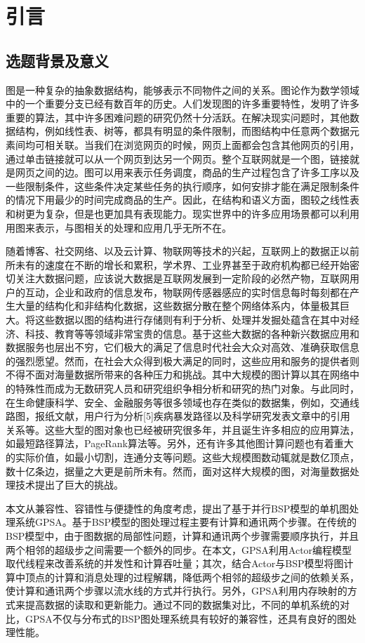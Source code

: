 
\chapter{引言}
\section{选题背景及意义}


图是一种复杂的抽象数据结构，能够表示不同物件之间的关系。图论作为数学领域中的一个重要分支已经有数百年的历史。人们发现图的许多重要特性，发明了许多重要的算法，其中许多困难问题的研究仍然十分活跃。在解决现实问题时，其他数据结构，例如线性表、树等，都具有明显的条件限制，而图结构中任意两个数据元素间均可相关联。当我们在浏览网页的时候，网页上面都会包含其他网页的引用，通过单击链接就可以从一个网页到达另一个网页。整个互联网就是一个图，链接就是网页之间的边。图可以用来表示任务调度，商品的生产过程包含了许多工序以及一些限制条件，这些条件决定某些任务的执行顺序，如何安排才能在满足限制条件的情况下用最少的时间完成商品的生产。因此，在结构和语义方面，图较之线性表和树更为复杂，但是也更加具有表现能力。现实世界中的许多应用场景都可以利用用图来表示，与图相关的处理和应用几乎无所不在。

随着博客、社交网络、以及云计算、物联网等技术的兴起，互联网上的数据正以前所未有的速度在不断的增长和累积，学术界、工业界甚至于政府机构都已经开始密切关注大数据问题，应该说大数据是互联网发展到一定阶段的必然产物，互联网用户的互动，企业和政府的信息发布，物联网传感器感应的实时信息每时每刻都在产生大量的结构化和非结构化数据，这些数据分散在整个网络体系内，体量极其巨大。将这些数据以图的结构进行存储则有利于分析、处理并发掘处蕴含在其中对经济、科技、教育等等领域非常宝贵的信息。基于这些大数据的各种新兴数据应用和数据服务也层出不穷，它们极大的满足了信息时代社会大众对高效、准确获取信息的强烈愿望。然而，在社会大众得到极大满足的同时，这些应用和服务的提供者则不得不面对海量数据所带来的各种压力和挑战。其中大规模的图计算以其在网络中的特殊性而成为无数研究人员和研究组织争相分析和研究的热门对象。与此同时，在生命健康科学、安全、金融服务等很多领域也存在类似的数据集，例如，交通线路图，报纸文献，用户行为分析[5]疾病暴发路径以及科学研究发表文章中的引用关系等。这些大型的图对象也已经被研究很多年，并且诞生许多相应的应用算法，如最短路径算法，PageRank算法等。另外，还有许多其他图计算问题也有着重大的实际价值，如最小切割，连通分支等问题。这些大规模图数动辄就是数亿顶点，数十亿条边，据量之大更是前所未有。然而，面对这样大规模的图，对海量数据处理技术提出了巨大的挑战。


本文从兼容性、容错性与便捷性的角度考虑，提出了基于并行BSP模型的单机图处理系统GPSA。基于BSP模型的图处理过程主要有计算和通讯两个步骤。在传统的BSP模型中，由于图数据的局部性问题，计算和通讯两个步骤需要顺序执行，并且两个相邻的超级步之间需要一个额外的同步。在本文，GPSA利用Actor编程模型取代线程来改善系统的并发性和计算吞吐量；其次，结合Actor与BSP模型将图计算中顶点的计算和消息处理的过程解耦，降低两个相邻的超级步之间的依赖关系，使计算和通讯两个步骤以流水线的方式并行执行。另外，GPSA利用内存映射的方式来提高数据的读取和更新能力。通过不同的数据集对比，不同的单机系统的对比，GPSA不仅与分布式的BSP图处理系统具有较好的兼容性，还具有良好的图处理性能。

